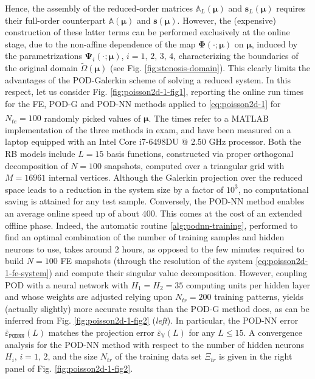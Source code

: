 \documentclass[12pt, a4paper, twoside, openright, notitlepage]{report}
\numberwithin{equation}{chapter}
\theoremstyle{theorem}
\theoremstyle{definition}
\theoremstyle{remark}
\theoremstyle{proposition}
\numberwithin{figure}{chapter}
\newcommand{\wt}[1]{\widetilde{#1}}
\newcommand{\bg}[1]{\boldsymbol{#1}}
\begin{document}
		Hence, the assembly of the reduced-order matrices $\mathbb{A}_L(\bg{\mu})$ and $\mathbf{s}_L(\bg{\mu})$ requires their full-order counterpart $\mathbb{A}(\bg{\mu})$ and $\mathbf{s}(\bg{\mu})$. However, the (expensive) construction of these latter terms can be performed exclusively at the online stage, due to the non-affine dependence of the map $\bg{\Phi}(\cdot; \bg{\mu})$ on $\bg{\mu}$, induced by the parametrizations $\bg{\Psi}_i(\cdot; \bg{\mu})$, $i = 1, \, 2, \, 3, \, 4$, characterizing the boundaries of the original domain $\wt{\Omega}(\bg{\mu})$ (see Fig. \ref{fig:stenosis-domain}). This clearly limits the advantages of the POD-Galerkin scheme of solving a reduced system. In this respect, let us consider Fig. \ref{fig:poisson2d-1-fig1}, reporting the online run times for the FE, POD-G and POD-NN methods applied to \eqref{eq:poisson2d-1} for $N_{te} = 100$ randomly picked values of $\bg{\mu}$. The times refer to a MATLAB\textsuperscript{\textregistered} implementation of the three methods in exam, and have been measured on a laptop equipped with an Intel Core i7-6498DU @ 2.50 GHz processor. Both the RB models include $L = 15$ basis functions, constructed via proper orthogonal decomposition of $N = 100$ snapshots, computed over a triangular grid with $M = 16961$ internal vertices. Although the Galerkin projection over the reduced space leads to a reduction in the system size by a factor of $10^3$, no computational saving is attained for any test sample. Conversely, the POD-NN method enables an average online speed up of about $400$. This comes at the cost of an extended offline phase. Indeed, the automatic routine \ref{alg:podnn-training}, performed to find an optimal combination of the number of training samples and hidden neurons to use, takes around $2$ hours, as opposed to the few minutes required to build $N = 100$ FE snapshots (through the resolution of the system \eqref{eq:poisson2d-1-fe-system}) and compute their singular value decomposition. However, coupling POD with a neural network with $H_1 = H_2 = 35$ computing units per hidden layer and whose weights are adjusted relying upon $N_{tr} = 200$ training patterns, yields (actually slightly) more accurate results than the POD-G method does, as can be inferred from Fig. \ref{fig:poisson2d-1-fig2} (\emph{left}). In particular, the POD-NN error $\bar{\varepsilon}_{\texttt{PODNN}}^{}(L)$ matches the projection error $\bar{\varepsilon}_{\mathbb{V}}^{}(L)$ for any $L \leq 15$. A convergence analysis for the POD-NN method with respect to the number of hidden neurons $H_i$, $i = 1, \, 2$, and the size $N_{tr}$ of the training data set $\Xi_{tr}$ is given in the right panel of Fig. \ref{fig:poisson2d-1-fig2}.
		
\end{document}
